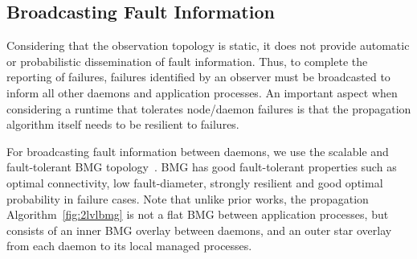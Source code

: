\documentclass[5p,times,twocolumn]{elsarticle}
\begin{document}

\subsection{Broadcasting Fault Information}
Considering that the observation topology is static, it does not provide
automatic or probabilistic dissemination of fault information. Thus, to complete
the reporting of failures, failures identified by an observer must be broadcasted
to inform all other daemons and application processes. An important aspect
when considering a runtime that tolerates node/daemon failures is that the
propagation algorithm itself needs to be resilient to failures.

For broadcasting fault information between daemons, we use the scalable and fault-tolerant BMG topology~\cite{Angskun07}. BMG has good fault-tolerant properties such
as optimal connectivity, low fault-diameter, strongly resilient and good optimal
probability in failure cases. Note that unlike prior works, the propagation
Algorithm~\ref{fig:2lvlbmg} is not a flat BMG between application processes, but consists of an
inner BMG overlay between daemons, and an outer star overlay from each daemon to its
local managed processes.
\end{document}
